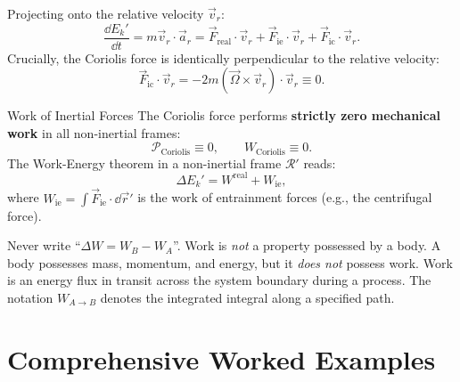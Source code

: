 Projecting onto the relative velocity $\vec{v}_r$:
\[
\frac{\dd E_k'}{\dd t} = m\vec{v}_r \cdot \vec{a}_r = \vec{F}_{\text{real}} \cdot \vec{v}_r + \vec{F}_{\text{ie}} \cdot \vec{v}_r + \vec{F}_{\text{ic}} \cdot \vec{v}_r.
\]
Crucially, the Coriolis force is identically perpendicular to the relative velocity:
\[
\vec{F}_{\text{ic}} \cdot \vec{v}_r = -2m (\vec{\Omega} \times \vec{v}_r) \cdot \vec{v}_r \equiv 0.
\]
\begin{lawbox}{Work of Inertial Forces}
The Coriolis force performs \textbf{strictly zero mechanical work} in all non-inertial frames:
\begin{equation}
\mathcal{P}_{\text{Coriolis}} \equiv 0, \qquad W_{\text{Coriolis}} \equiv 0.
\end{equation}
The Work-Energy theorem in a non-inertial frame $\mathcal{R}'$ reads:
\begin{equation}
\Delta E_k' = W^{\text{real}} + W_{\text{ie}},
\end{equation}
where $W_{\text{ie}} = \int \vec{F}_{\text{ie}}\cdot\dd\vec{r}'$ is the work of entrainment forces (e.g., the centrifugal force).
\end{lawbox}

\begin{cautionbox}
Never write ``$\Delta W = W_B - W_A$''. Work is \emph{not} a property possessed by a body. A body possesses mass, momentum, and energy, but it \emph{does not} possess work. Work is an energy flux in transit across the system boundary during a process. The notation $W_{A\to B}$ denotes the integrated integral along a specified path.
\end{cautionbox}

\section{Comprehensive Worked Examples}

